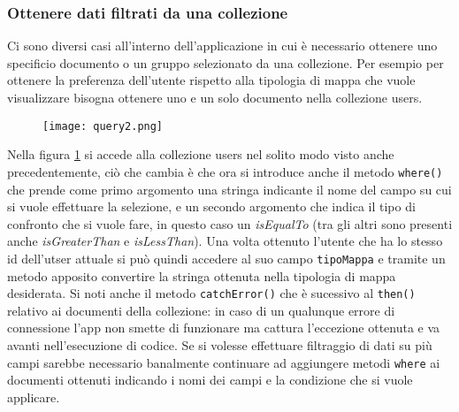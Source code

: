\subsubsection{Ottenere dati filtrati da una collezione}
Ci sono diversi casi all'interno dell'applicazione in cui è necessario ottenere
uno specificio documento o un gruppo selezionato da una collezione. Per esempio
per ottenere la preferenza dell'utente rispetto alla tipologia di mappa che
vuole visualizzare bisogna ottenere uno e un solo documento nella collezione
users. \\
\begin{figure}[!h]
    \centering
    \texttt{[image: query2.png]}
    \caption{}
    \label{query2}
\end{figure}
Nella figura \ref{query2} si accede alla collezione users nel solito modo visto
anche precedentemente, ciò che cambia è che ora si introduce anche il metodo
\verb|where()| che prende come primo argomento una stringa indicante il nome del
campo su cui si vuole effettuare la selezione, e un secondo argomento che indica
il tipo di confronto che si vuole fare, in questo caso un \textit{isEqualTo}
(tra gli altri sono presenti anche \textit{isGreaterThan} e
\textit{isLessThan}). Una volta ottenuto l'utente che ha lo stesso id
dell'utser attuale si può quindi accedere al suo campo \verb|tipoMappa| e
tramite un metodo apposito convertire la stringa ottenuta nella tipologia di
mappa desiderata. Si noti anche il metodo \verb|catchError()| che è sucessivo al
\verb|then()| relativo ai documenti della collezione: in caso di un qualunque errore di
connessione l'app non smette di funzionare ma cattura l'eccezione ottenuta e va
avanti nell'esecuzione di codice. Se si volesse effettuare filtraggio di dati su
più campi sarebbe necessario banalmente continuare ad aggiungere metodi
\verb|where| ai documenti ottenuti indicando i nomi dei campi e la condizione
che si vuole applicare.


